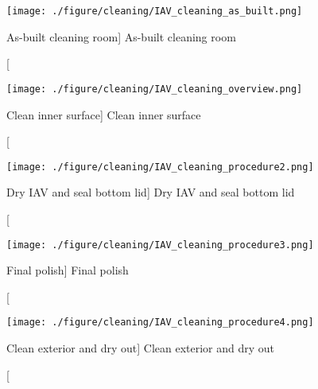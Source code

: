 \begin{figure}
    \centering
    \texttt{[image: ./figure/cleaning/IAV\_cleaning\_as\_built.png]}
    \caption
    [As-built cleaning room]
    {As-built cleaning room}
    \label{fig:IAV_cleaning_as_built.png}
    \end{figure}

\begin{figure}
    \centering
    \texttt{[image: ./figure/cleaning/IAV\_cleaning\_overview.png]}
    \caption
    [Clean inner surface]
    {Clean inner surface}
    \label{fig:IAV_cleaning_overview.png}
    \end{figure}

\begin{figure}
    \centering
    \texttt{[image: ./figure/cleaning/IAV\_cleaning\_procedure2.png]}
    \caption
    [Dry IAV and seal bottom lid]
    {Dry IAV and seal bottom lid}
    \label{fig:IAV_cleaning_procedure2.png}
    \end{figure}

\begin{figure}
    \centering
    \texttt{[image: ./figure/cleaning/IAV\_cleaning\_procedure3.png]}
    \caption
    [Final polish]
    {Final polish}
    \label{fig:IAV_cleaning_procedure3.png}
    \end{figure}

\begin{figure}
    \centering
    \texttt{[image: ./figure/cleaning/IAV\_cleaning\_procedure4.png]}
    \caption
    [Clean exterior and dry out]
    {Clean exterior and dry out}
    \label{fig:IAV_cleaning_procedure4.png}
    \end{figure}


%
%
%
%
%
%
%
%
%
%
%
%
%
%
%
%
%
